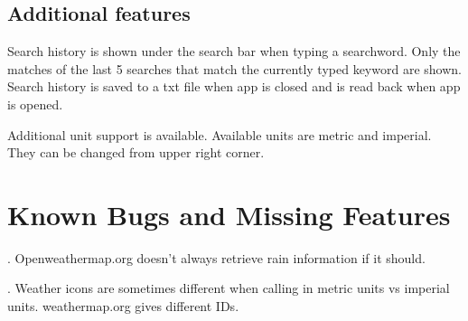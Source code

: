 \documentclass[a4paper,10pt]{article}
\begin{document}
\subsection{Additional features}

Search history is shown under the search bar when typing a searchword. Only the matches of the last 5 searches that match the currently typed keyword are shown. Search history is saved to a txt file when app is closed and is read back when app is opened.

Additional unit support is available. Available units are metric and imperial. They can be changed from upper right corner.




\section{Known Bugs and Missing Features}

. Openweathermap.org doesn't always retrieve rain information if it should. 

. Weather icons are sometimes different when calling in metric units vs imperial units. weathermap.org gives different IDs.
\end{document}
